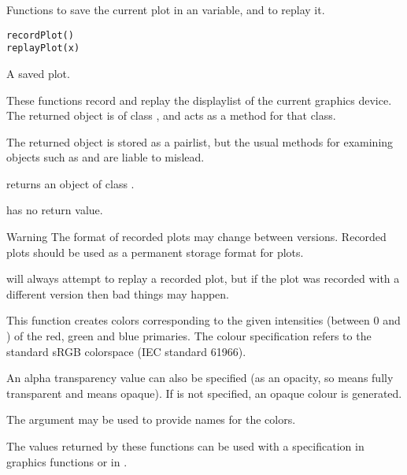 %
\begin{Description}\relax
Functions to save the current plot in an \R{} variable, and to replay it.
\end{Description}
%
\begin{Usage}
\begin{verbatim}
recordPlot()
replayPlot(x)
\end{verbatim}
\end{Usage}
%
\begin{Arguments}
\begin{ldescription}
\item[\code{x}] A saved plot.
\end{ldescription}
\end{Arguments}
%
\begin{Details}\relax
These functions record and replay the displaylist of the current
graphics device.  The returned object is of class
, and  acts as a 
method for that class.

The returned object is stored as a pairlist, but the usual methods for
examining \R{} objects such as  and
 are liable to mislead. 
\end{Details}
%
\begin{Value}
 returns an object of class .

 has no return value.
\end{Value}
%
\begin{Section}{Warning}
The format of recorded plots may change between \R{} versions.
Recorded plots should  be used as a permanent
storage format for \R{} plots.

\R{} will always attempt to replay a recorded plot, but if the plot was 
recorded with a different \R{} version then bad things may happen.
\end{Section}
%
\begin{Description}\relax
This function creates colors corresponding to the given
intensities (between 0 and ) of the red, green and blue
primaries.  The colour specification refers to the
standard sRGB colorspace (IEC standard 61966).

An alpha transparency value can also be specified (as an opacity, so
 means fully transparent and  means opaque).  If
 is not specified, an opaque colour is generated.

The  argument may be used to provide names for the
colors.

The values returned by these functions can be used with a
 specification in graphics functions or in .
\end{Description}
